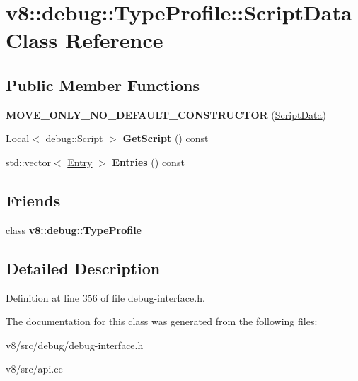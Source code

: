 \hypertarget{classv8_1_1debug_1_1TypeProfile_1_1ScriptData}{}\section{v8\+:\+:debug\+:\+:Type\+Profile\+:\+:Script\+Data Class Reference}
\label{classv8_1_1debug_1_1TypeProfile_1_1ScriptData}
\subsection*{Public Member Functions}
\begin{DoxyCompactItemize}
\item 
\mbox{\label{classv8_1_1debug_1_1TypeProfile_1_1ScriptData_ae52deb6981fb4876cebf48ba961ef0cc}} 
{\bfseries M\+O\+V\+E\+\_\+\+O\+N\+L\+Y\+\_\+\+N\+O\+\_\+\+D\+E\+F\+A\+U\+L\+T\+\_\+\+C\+O\+N\+S\+T\+R\+U\+C\+T\+OR} (\mbox{\hyperlink{classv8_1_1debug_1_1TypeProfile_1_1ScriptData}{Script\+Data}})
\item 
\mbox{\label{classv8_1_1debug_1_1TypeProfile_1_1ScriptData_a86d991462b8d20251cefb5d0b6f8bd41}} 
\mbox{\hyperlink{classv8_1_1Local}{Local}}$<$ \mbox{\hyperlink{classv8_1_1debug_1_1Script}{debug\+::\+Script}} $>$ {\bfseries Get\+Script} () const
\item 
\mbox{\label{classv8_1_1debug_1_1TypeProfile_1_1ScriptData_a6cec87505a755a1f844a4b3f0db17045}} 
std\+::vector$<$ \mbox{\hyperlink{classv8_1_1debug_1_1TypeProfile_1_1Entry}{Entry}} $>$ {\bfseries Entries} () const
\end{DoxyCompactItemize}
\subsection*{Friends}
\begin{DoxyCompactItemize}
\item 
\mbox{\label{classv8_1_1debug_1_1TypeProfile_1_1ScriptData_ac2d4758e03bfb7e76b70432dd724704c}} 
class {\bfseries v8\+::debug\+::\+Type\+Profile}
\end{DoxyCompactItemize}


\subsection{Detailed Description}


Definition at line 356 of file debug-\/interface.\+h.



The documentation for this class was generated from the following files\+:\begin{DoxyCompactItemize}
\item 
v8/src/debug/debug-\/interface.\+h\item 
v8/src/api.\+cc\end{DoxyCompactItemize}
